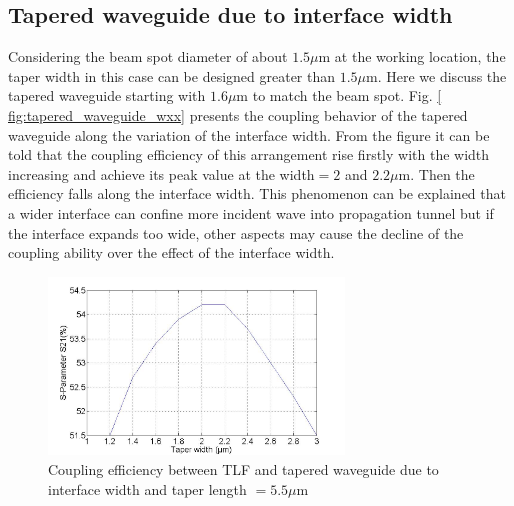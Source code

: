 \subsection{Tapered waveguide due to interface width} 
Considering the beam spot diameter of about $1.5\mu$m at the working location, the taper width in this case can be designed greater than $1.5\mu$m. Here we discuss the tapered waveguide starting with $1.6\mu$m to match the beam spot. Fig. \ref{ fig:tapered_waveguide_wxx} presents the coupling behavior of the tapered waveguide along the variation of the interface width. From the figure it can be told that the coupling efficiency of this arrangement rise firstly with the width increasing and achieve its peak value at the width$=2$ and $2.2\mu$m. Then the efficiency falls along the interface width. This phenomenon can be explained that a wider interface can confine more incident wave into propagation tunnel but if the interface expands too wide, other aspects may cause the decline of the coupling ability over the effect of the interface width. 


\begin{figure}[!ht]
\centering
\includegraphics[width=0.7\textwidth]{bilder/tapered_waveguide_wxx}
\caption{Coupling efficiency between TLF and tapered waveguide due to interface width and taper length $= 5.5\mu$m}
\label{fig:tapered_waveguide_wxx}
\end{figure}
